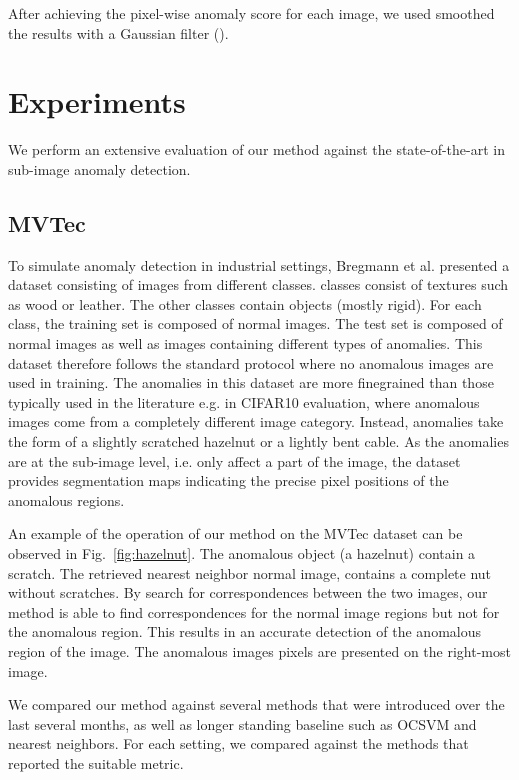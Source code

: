 \documentclass[runningheads]{llncs}
\begin{document}
After achieving the pixel-wise anomaly score for each image, we used smoothed the results with a Gaussian filter ().

\section{Experiments}
\label{sec:exp}

We perform an extensive evaluation of our method against the state-of-the-art in sub-image anomaly detection.

\subsection{MVTec}

To simulate anomaly detection in industrial settings, \cite{bergmann2019mvtec} Bregmann et al. presented a dataset consisting of images from  different classes.  classes consist of textures such as wood or leather. The other  classes contain objects (mostly rigid). For each class, the training set is composed of normal images. The test set is composed of normal images as well as images containing different types of anomalies. This dataset therefore follows the standard protocol where no anomalous images are used in training. The anomalies in this dataset are more finegrained than those typically used in the literature e.g. in CIFAR10 evaluation, where anomalous images come from a completely different image category. Instead, anomalies take the form of a slightly scratched hazelnut or a lightly bent cable. As the anomalies are at the sub-image level, i.e. only affect a part of the image, the dataset provides segmentation maps indicating the precise pixel positions of the anomalous regions. 

An example of the operation of our method on the MVTec dataset can be observed in Fig.~\ref{fig:hazelnut}. The anomalous object (a hazelnut) contain a scratch. The retrieved nearest neighbor normal image, contains a complete nut without scratches. By search for correspondences between the two images, our method is able to find correspondences for the normal image regions but not for the anomalous region. This results in an accurate detection of the anomalous region of the image. The anomalous images pixels are presented on the right-most image.  

We compared our method against several methods that were introduced over the last several months, as well as longer standing baseline such as OCSVM and nearest neighbors. For each setting, we compared against the methods that reported the suitable metric.
\end{document}
